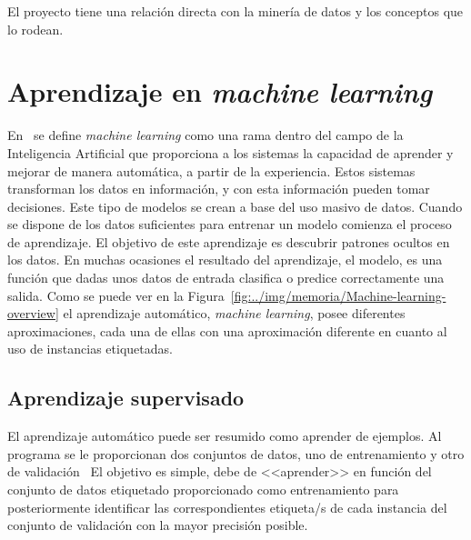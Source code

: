 
El proyecto tiene una relación directa con la minería de datos y los conceptos que lo rodean. 

\section{Aprendizaje en \textit{machine learning}}
En~\cite{sanchez_2020} se define \textit{machine learning} como una rama dentro del campo de la Inteligencia Artificial que proporciona a los sistemas la capacidad de aprender y mejorar de manera automática, a partir de la experiencia. Estos sistemas transforman los datos en información, y con esta información pueden tomar decisiones. Este tipo de modelos se crean a base del uso masivo de datos. Cuando se dispone de los datos suficientes para entrenar un modelo comienza el proceso de aprendizaje. El objetivo de este aprendizaje es descubrir patrones ocultos en los datos. En muchas ocasiones el resultado del aprendizaje, el modelo, es una función que dadas unos datos de entrada clasifica o predice correctamente una salida. Como se puede ver en la Figura~\ref{fig:../img/memoria/Machine-learning-overview} el aprendizaje automático, \textit{machine learning}, posee diferentes aproximaciones, cada una de ellas con una aproximación diferente en cuanto al uso de instancias etiquetadas.



\subsection{Aprendizaje supervisado}\label{subsec:Aprendizaje-Supervisado}
El aprendizaje automático puede ser resumido como aprender de ejemplos. Al programa se le proporcionan dos conjuntos de datos, uno de entrenamiento y otro de validación~\cite{learned2014introduction} El objetivo es simple, debe de <<aprender>> en función del conjunto de datos etiquetado proporcionado como entrenamiento para posteriormente identificar las correspondientes etiqueta/s de cada instancia del conjunto de validación con la mayor precisión posible. 

